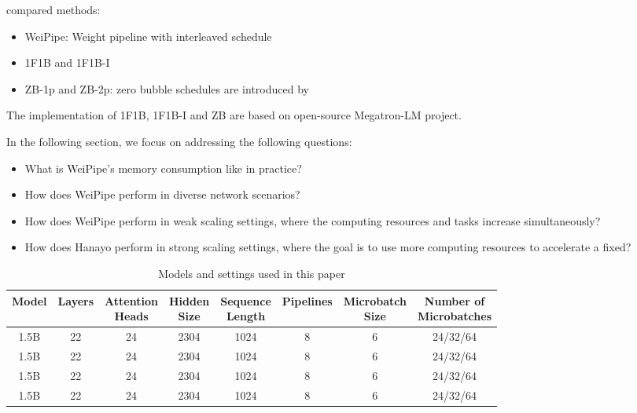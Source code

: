 \documentclass[sigplan,screen]{acmart}
\begin{document}
compared methods:
\begin{itemize}
    \item WeiPipe: Weight pipeline with interleaved schedule 
    \item 1F1B and 1F1B-I
    \item ZB-1p and ZB-2p: zero bubble schedules are introduced by
    
\end{itemize}
The implementation of 1F1B, 1F1B-I and ZB are based on open-source Megatron-LM project. 


In the following section, we focus on addressing the following questions:
\begin{itemize}
    \item What is WeiPipe's memory consumption like in practice? 
    \item How does WeiPipe perform in diverse network scenarios?
    \item How does WeiPipe perform in weak scaling settings, where the computing resources and tasks increase simultaneously?
    \item How does Hanayo perform in strong scaling settings, where the goal is to use more computing resources to accelerate a fixed?
\end{itemize}




\begin{table}[!ht]
    \centering
    \begin{tabular}{c|c|c|c|c|c|c|c}
    \hline
       Model  &  Layers & \makecell[c]{Attention\\Heads}  & \makecell[c]{Hidden\\Size} &\makecell[c]{Sequence\\Length}& Pipelines &  \makecell[c]{Microbatch\\Size} & \makecell[c]{ Number of \\ Microbatches }  \\
       \hline
       1.5B & 22 & 24 & 2304 & 1024 & 8 & 6 & 24/32/64 \\
       \hline
       1.5B & 22 & 24 & 2304 & 1024 & 8 & 6 & 24/32/64 \\
       \hline
       1.5B & 22 & 24 & 2304 & 1024 & 8 & 6 & 24/32/64 \\
       \hline
       1.5B & 22 & 24 & 2304 & 1024 & 8 & 6 & 24/32/64 \\
      
    \end{tabular} 
    \caption{Models and settings used in this paper}
    \label{tab:setting}
\end{table}
    
\end{document}
